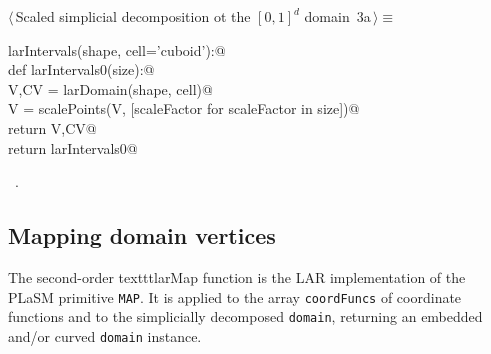 \documentclass[11pt,oneside]{article}	%
\begin{document}
\begin{flushleft} \small \label{scrap2}
\protect{}$\langle\,$Scaled simplicial decomposition ot the $[0,1]^d$ domain\nobreak\ {\footnotesize 3a}$\,\rangle\equiv$
\vspace{-1ex}
\begin{list}{}{} \item
\mbox{}\verb@def larIntervals(shape, cell='cuboid'):@\\
\mbox{}\verb@   def larIntervals0(size):@\\
\mbox{}\verb@      V,CV = larDomain(shape, cell)@\\
\mbox{}\verb@      V = scalePoints(V, [scaleFactor for scaleFactor in size])@\\
\mbox{}\verb@      return V,CV@\\
\mbox{}\verb@   return larIntervals0@\\
\mbox{}\verb@@{\NWsep}
\end{list}
\vspace{-1ex}
\footnotesize\addtolength{\baselineskip}{-1ex}
\begin{list}{}{\setlength{\itemsep}{-\parsep}\setlength{\itemindent}{-\leftmargin}}
\item \NWtxtMacroRefIn\ .
\end{list}
\end{flushleft}

\subsection{Mapping domain vertices}
The second-order texttt{larMap} function is the LAR implementation of the PLaSM primitive \texttt{MAP}.
It is applied to the array \texttt{coordFuncs} of coordinate functions and to the simplicially decomposed  \texttt{domain}, returning an embedded and/or curved \texttt{domain} instance.
\end{document}
